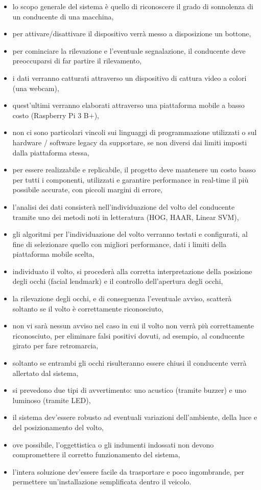 \documentclass[12pt]{article}
\begin{document}
\begin{itemize}
	\item lo scopo generale del sistema è quello di riconoscere il grado di sonnolenza di un conducente di una macchina,
	\item per attivare/disattivare il dispositivo verrà messo a disposizione un bottone,
	\item per cominciare la rilevazione e l'eventuale segnalazione, il conducente deve preoccuparsi di far partire il rilevamento,
	\item i dati verranno catturati attraverso un dispositivo di cattura video a colori (una webcam),
	\item quest'ultimi verranno elaborati attraverso una piattaforma mobile a basso costo (Raspberry Pi 3 B+),
	\item non ci sono particolari vincoli sui linguaggi di programmazione utilizzati o sul hardware / software legacy da supportare, se non diversi dai limiti imposti dalla piattaforma stessa,
	\item per essere realizzabile e replicabile, il progetto deve mantenere un costo basso per tutti i componenti, utilizzati e garantire performance in real-time il più possibile accurate, con piccoli margini di errore,
	\item l'analisi dei dati consisterà nell'individuazione del volto del conducente tramite uno dei metodi noti in letteratura (HOG, HAAR, Linear SVM),
	\item gli algoritmi per l'individuazione del volto verranno testati e configurati, al fine di selezionare quello con migliori performance, dati i limiti della piattaforma mobile scelta,
	\item individuato il volto, si procederà alla corretta interpretazione della posizione degli occhi (facial lendmark) e il controllo dell'apertura degli occhi,
	\item la rilevazione degli occhi, e di conseguenza l'eventuale avviso, scatterà soltanto se il volto è correttamente riconosciuto,
	\item non vi sarà nessun avviso nel caso in cui il volto non verrà più correttamente riconosciuto, per eliminare falsi positivi dovuti, ad esempio, al conducente girato per fare retromarcia,
	\item soltanto se entrambi gli occhi risulteranno essere chiusi il conducente verrà allertato dal sistema,
	\item si prevedono due tipi di avvertimento: uno acustico (tramite buzzer) e uno luminoso (tramite LED),
	\item il sistema dev'essere robusto ad eventuali variazioni dell'ambiente, della luce e del posizionamento del volto,
	\item ove possibile, l'oggettistica o gli indumenti indossati non devono compromettere il corretto funzionamento del sistema,
	\item l'intera soluzione dev'essere facile da trasportare e poco ingombrande, per permettere un'installazione semplificata dentro il veicolo.
\end{itemize}
\end{document}
